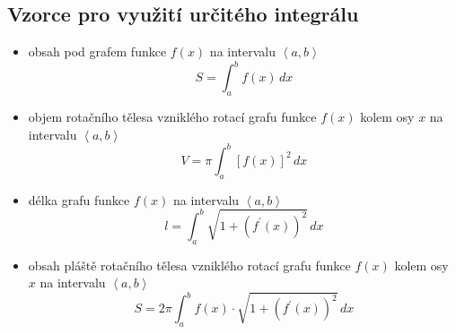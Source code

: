 \subsection*{Vzorce pro využití určitého integrálu}
\begin{itemize}
\item obsah pod grafem funkce $f(x)$ na intervalu $\left < a,b \right > $
$$S=\int_a ^b f(x)\, dx$$
\item objem rotačního tělesa vzniklého rotací grafu funkce $f(x)$ kolem osy $x$ na intervalu $\left < a,b \right > $
$$V=\pi \int_a ^b \left [ f(x) \right ]^2 \, dx $$
\item délka grafu funkce $f(x)$ na intervalu $\left < a,b \right > $
$$l=\int_a^b \sqrt{1+\left ( f^\prime(x) \right )^2 } \, dx$$
\item obsah pláště rotačního tělesa vzniklého rotací grafu funkce $f(x)$ kolem osy $x$ na intervalu $\left < a,b \right > $
$$S=2\pi \int _a ^b f(x)\cdot \sqrt{1+\left ( f^\prime(x) \right )^2 }\, dx $$
\end{itemize}
